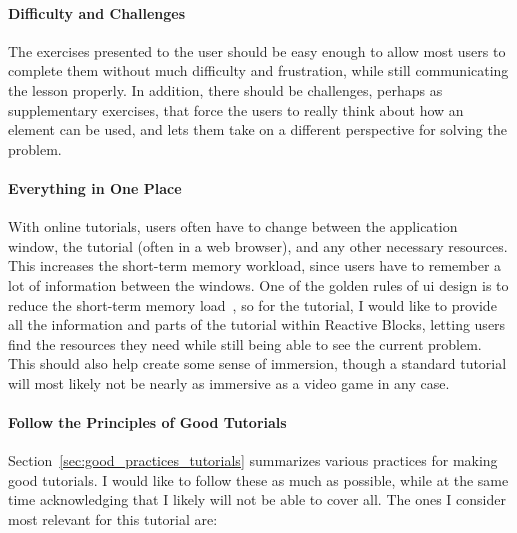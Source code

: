 \paragraph{Difficulty and Challenges} The exercises presented to the user should be easy enough to allow most users to complete them without much difficulty and frustration, while still communicating the lesson properly. In addition, there should be challenges, perhaps as supplementary exercises, that force the users to really think about how an element can be used, and lets them take on a different perspective for solving the problem.

\paragraph{Everything in One Place} With online tutorials, users often have to change between the application window, the tutorial (often in a web browser), and any other necessary resources. This increases the short-term memory workload, since users have to remember a lot of information between the windows. One of the golden rules of \gls{ui} design is to reduce the short-term memory load~\cite{shneiderman:user_interface}, so for the tutorial, I would like to provide all the information and parts of the tutorial within Reactive Blocks, letting users find the resources they need while still being able to see the current problem. This should also help create some sense of immersion, though a standard tutorial will most likely not be nearly as immersive as a video game in any case.

\paragraph{Follow the Principles of Good Tutorials} Section~\ref{sec:good_practices_tutorials} summarizes various practices for making good tutorials. I would like to follow these as much as possible, while at the same time acknowledging that I likely will not be able to cover all. The ones I consider most relevant for this tutorial are:

